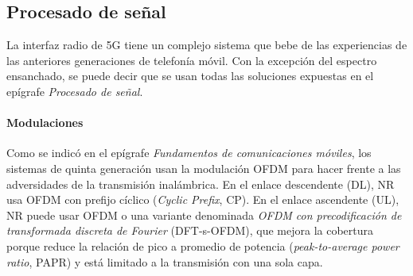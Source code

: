 \documentclass[12pt]{report} %
\begin{document}
\subsection{Procesado de señal}

La interfaz radio de 5G tiene un complejo sistema que bebe de las experiencias de las anteriores generaciones de telefonía móvil.
Con la excepción del espectro ensanchado, se puede decir que se usan todas las soluciones expuestas en el epígrafe \textit{Procesado de señal}.
\cite{RefWorks:7}


\paragraph{Modulaciones}

Como se indicó en el epígrafe \textit{Fundamentos de comunicaciones móviles}, los sistemas de quinta generación usan la modulación OFDM para hacer frente a las adversidades de la transmisión inalámbrica.
En el enlace descendente (DL), NR usa OFDM con prefijo cíclico (\textit{Cyclic Prefix}, CP).
En el enlace ascendente (UL), NR puede usar OFDM o una variante denominada \textit{OFDM con precodificación de transformada discreta de Fourier} (DFT-s-OFDM),
que mejora la cobertura porque reduce la relación de pico a promedio de potencia (\textit{peak-to-average power ratio}, PAPR) y está limitado a la transmisión con una sola capa.
\cite{RefWorks:47}
\end{document}
